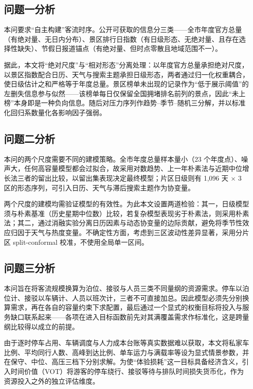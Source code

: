 \documentclass[withoutpreface,bwprint]{cumcmthesis}
\begin{document}
\subsection{问题一分析}
本问要求“自主构建”客流时序。公开可获取的信息分三类——全市年度官方总量（有绝对量、无日内分布）、景区排行日指数（有日级形态、无绝对量、且存在选择性缺失）、节假日报道锚点（有绝对量、但时点零散且地域范围不一）。

据此，本文将“绝对尺度”与“相对形态”分离处理：以年度官方总量承担绝对尺度，以景区指数配合日历、天气与搜索主题承担日级形态，两者通过归一化权重耦合，使日级估计之和严格等于年度总量。景区榜单未出现的记录作为“低于展示阈值”的左删失信息参与似然——该榜单每日仅保留全国拥堵排名前列的景点，因此“未上榜”本身即是一种负向信息。随后对压力序列作趋势--季节--随机三分解，并以标准化回归系数量化各影响因子强弱。

\subsection{问题二分析}
本问的两个尺度需要不同的建模策略。全市年度总量样本量小（23 个年度点）、噪声大，任何高容量模型都会过拟合，故采用对数趋势、上一年朴素法与近期中位增长法三者的留出比较，以留出集表现决定最终模型；片区日级则有 1{,}096 天 $\times$ 3 区的形态序列，可引入日历、天气与滞后搜索主题作为协变量。

两个尺度的建模均需验证模型的有效性。为此本文设置两道检验：其一，日级模型须与朴素基准（历史星期中位数）比较，若复杂模型表现劣于朴素法，则采用朴素法；其二，通过消融实验分离日历因素与动态协变量的边际贡献，避免将季节性效应归因于天气与热度变量。不确定性方面，考虑到三区波动性差异显著，采用分片区 split-conformal 校准，不使用全局单一区间。

\subsection{问题三分析}
本问旨在将客流规模换算为泊位、接驳与人员三类不同量纲的资源需求。停车以泊位计、接驳以车辆计、人员以班次计，三者不可直接加总。因此模型必须先分别换算需求，再在各自的容量约束下求配置，最后通过一个显式的权衡目标将投入与服务缺口联系起来——各项在进入目标函数前先对其满覆盖需求作标准化，这是跨量纲比较得以成立的前提。

由于逐时停车占用、车辆调度与人力成本台账等真实数据难以获取，本文将私家车比例、平均同行人数、高峰到达比例、单车运力与满载率等设为显式情景参数，并在保守、中位、高压三档下分别求解。为使“体验损耗”这一目标具备经济含义，引入时间价值（VOT）将游客的停车绕行、接驳等待与排队时间损失货币化，作为资源投入之外的独立评估维度。
\end{document}
